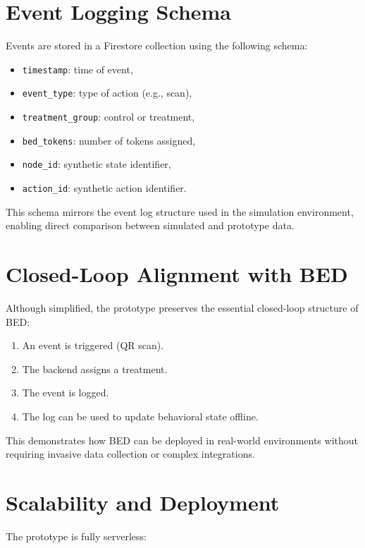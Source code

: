 \section{Event Logging Schema}

Events are stored in a Firestore collection using the following schema:

\begin{itemize}
    \item \texttt{timestamp}: time of event,
    \item \texttt{event\_type}: type of action (e.g., scan),
    \item \texttt{treatment\_group}: control or treatment,
    \item \texttt{bed\_tokens}: number of tokens assigned,
    \item \texttt{node\_id}: synthetic state identifier,
    \item \texttt{action\_id}: synthetic action identifier.
\end{itemize}

This schema mirrors the event log structure used in the simulation environment,
enabling direct comparison between simulated and prototype data.

\section{Closed-Loop Alignment with BED}

Although simplified, the prototype preserves the essential closed-loop structure
of BED:

\begin{enumerate}
    \item An event is triggered (QR scan).
    \item The backend assigns a treatment.
    \item The event is logged.
    \item The log can be used to update behavioral state offline.
\end{enumerate}

This demonstrates how BED can be deployed in real-world environments without
requiring invasive data collection or complex integrations.

\section{Scalability and Deployment}

The prototype is fully serverless:

